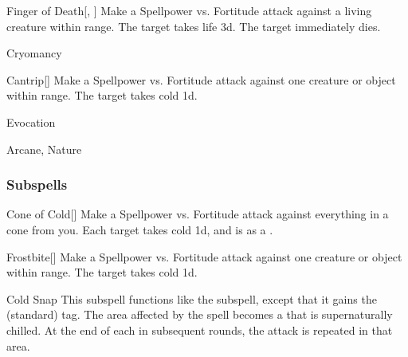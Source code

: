 \begin{ability}[\nth{7}]{Finger of Death}[, ]
Make a Spellpower vs. Fortitude attack against a living creature within \rngclose range.
\hit The target takes life  \plus3d.
\crit The target immediately dies.
\end{ability}
\vspace{0.25em}

\newpage
\begin{spellsection}{Cryomancy}

\begin{spellheader}
\end{spellheader}


\begin{ability}{Cantrip}[]
Make a Spellpower vs. Fortitude attack against one creature or object within \rngmed range.
\hit The target takes cold  \minus1d.
\end{ability}




 Evocation

 Arcane, Nature
\end{spellsection}


\subsubsection{Subspells}


\begin{ability}[\nth{1}]{Cone of Cold}[]
Make a Spellpower vs. Fortitude attack against everything in a \areamed cone from you.
\hit Each target takes cold  \minus1d, and is  as a .
\end{ability}
\vspace{0.25em}


\begin{ability}[\nth{1}]{Frostbite}[]
Make a Spellpower vs. Fortitude attack against one creature or object within \rngmed range.
\hit The target takes cold  \plus1d.
\end{ability}
\vspace{0.25em}


\begin{ability}[\nth{2}]{Cold Snap}
This subspell functions like the  subspell, except that it gains the  (standard) tag.
The area affected by the spell becomes a  that is supernaturally chilled.
At the end of each  in subsequent rounds, the attack is repeated in that area.
\end{ability}
\vspace{0.25em}


